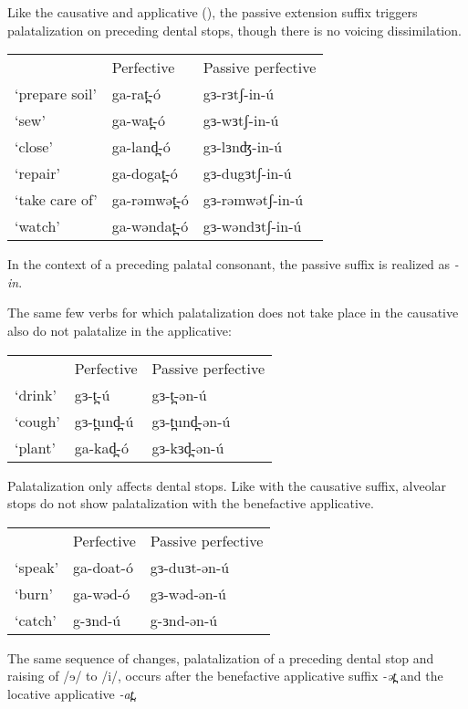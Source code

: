 Like the causative and applicative (), the passive extension suffix triggers palatalization on preceding dental stops, though there is no voicing dissimilation.


\ea
\begin{tabular}[t]{lll} %
&	Perfective	&	Passive perfective\\
‘prepare soil’	&	ga-rat̪-ó	&	gɜ-rɜtʃ-in-ú\\
‘sew’			&	ga-wat̪-ó	&	gɜ-wɜtʃ-in-ú\\
‘close’			&	ga-land̪-ó	&	gɜ-lɜnʤ-in-ú\\
‘repair’		&	ga-dogat̪-ó	&	gɜ-dugɜtʃ-in-ú\\
‘take care of’	&	ga-rəmwət̪-ó	&	gɜ-rəmwətʃ-in-ú\\
‘watch’			&	ga-wəndat̪-ó	&	gɜ-wəndɜtʃ-in-ú\\
\end{tabular}
\z
In the context of a preceding palatal consonant, the passive suffix is realized as \textit{-in}. 

The same few verbs for which palatalization does not take place in the causative also do not palatalize in the applicative:

\ea
\begin{tabular}[t]{lll} %
&	Perfective	&	Passive perfective\\
‘drink’	&	gɜ-t̪-ú	&	gɜ-t̪-ən-ú\\
‘cough’	&	gɜ-t̪und̪-ú	&	gɜ-t̪und̪-ən-ú\\
‘plant’	&	ga-kad̪-ó	&	gɜ-kɜd̪-ən-ú\\ 
\end{tabular}
\z
Palatalization only affects dental stops. Like with the causative suffix, alveolar stops do not show palatalization with the benefactive applicative. 
\ea 
\begin{tabular}[t]{lll} %
&	Perfective	&	Passive perfective\\
‘speak’	&	ga-doat-ó	&	gɜ-duɜt-ən-ú\\
‘burn’	&	ga-wəd-ó	&	gɜ-wəd-ən-ú\\
‘catch’	&	g-ɜnd-ú		&	g-ɜnd-ən-ú\\
\end{tabular}
\z

The same sequence of changes, palatalization of a preceding dental stop and raising of /ɘ/ to /i/, occurs after the benefactive applicative suffix \textit{-ət̪ } and the locative applicative \textit{-at̪}.

